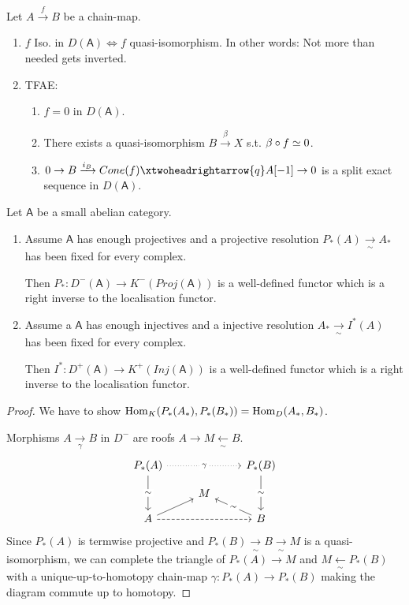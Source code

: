 \documentclass[fontsize=11pt,fleqn,a4paper]{scrartcl}
\begin{document}
\begin{theorem}
Let $A\xrightarrow{f}B$ be a chain-map.
\begin{enumerate}
\item $f$ Iso. in $D(\mathsf{A}) \iff f$ quasi-isomorphism. In other words: Not more than needed gets inverted.
\item TFAE:
\begin{enumerate}
\item $f=0$ in $D(\mathsf{A})$.
\item There exists a quasi-isomorphism $B\xrightarrow{\beta} X$ s.t. $\beta\circ f \overset{}{\simeq} 0$.
\item $0 \to B \xrightarrow{i_B} Cone(f) \xtwoheadrightarrow{q} A[-1] \to 0$ is a split exact sequence in $D(\mathsf{A})$.
\end{enumerate}
\end{enumerate}
\end{theorem}

\begin{lemma}
Let $\mathsf{A}$ be a small abelian category.
\begin{multicols}{2}
\begin{enumerate}
\item Assume $\mathsf{A}$ has enough projectives and a projective resolution $P_\ast(A) \xrightarrow[\sim]{} A_\ast$ has been fixed for every complex.

Then $P_\ast: D^-(\mathsf{A}) \to K^-(Proj(\mathsf{A}))$ is a well-defined functor which is a right inverse to the localisation functor.
\item Assume a $\mathsf{A}$ has enough injectives and a injective resolution $A_\ast \xrightarrow[\sim]{} I^\ast(A)$ has been fixed for every complex.

Then $I^\ast: D^+(\mathsf{A}) \to K^+(Inj(\mathsf{A}))$ is a well-defined functor which is a right inverse to the localisation functor.
\end{enumerate}
\end{multicols}
\end{lemma}
\begin{proof}
We have to show $\operatorname{Hom}_{K}(P_\ast(A_\ast) , P_\ast(B_\ast)) = \operatorname{Hom}_{D}(A_\ast,B_\ast)$.

Morphisms $A\xrightarrow[\gamma]{} B$ in $D^-$ are roofs $A \to M \xleftarrow[\sim]{} B$.
\[\begin{tikzcd}[row sep=small]
P_\ast(A) \ar[rr,dotted,"\gamma" description] \ar[dd,"\sim" description] && P_\ast(B) \ar[dd,"\sim" description] \\
& M & \\
A \ar[rr,dashed] \ar[ru] && B \ar[lu,"\sim" description]
\end{tikzcd}\]
Since $P_\ast(A)$ is termwise projective and $P_\ast(B) \xrightarrow[\sim]{}B \xrightarrow[\sim]{} M$ is a quasi-isomorphism, we can complete the triangle of $P_\ast(A) \to M$ and $M\xleftarrow[\sim]{} P_\ast(B)$ with a unique-up-to-homotopy chain-map $\gamma: P_\ast(A) \to P_\ast(B)$ making the diagram commute up to homotopy.
\end{proof}
\end{document}
